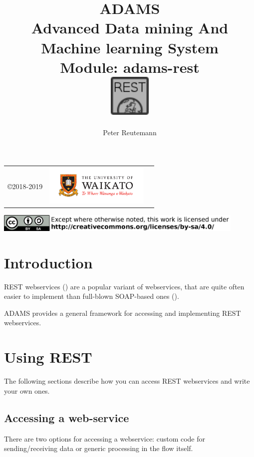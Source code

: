 \documentclass[a4paper]{book}
\title{
  \textbf{ADAMS} \\
  {\Large \textbf{A}dvanced \textbf{D}ata mining \textbf{A}nd \textbf{M}achine
  learning \textbf{S}ystem} \\
  {\Large Module: adams-rest} \\
  \vspace{1cm}
  \includegraphics[width=2cm]{images/rest-module.png} \\
}
\author{
  Peter Reutemann
}
\begin{document}
\begin{titlepage}
\maketitle

\thispagestyle{empty}
\center
\begin{table}[b]
	\begin{tabular}{c l l}
		\parbox[c][2cm]{2cm}{\copyright 2018-2019} &
		\parbox[c][2cm]{5cm}{\includegraphics[width=5cm]{images/coat_of_arms.pdf}} \\
	\end{tabular}
	\includegraphics[width=12cm]{images/cc.png} \\
\end{table}

\end{titlepage}

\tableofcontents

\chapter{Introduction}
REST webservices (\cite{rest}) are a popular variant of webservices, that
are quite often easier to implement than full-blown SOAP-based ones (\cite{soap}).

ADAMS provides a general framework for accessing and implementing REST webservices.

\chapter{Using REST}
The following sections describe how you can access REST webservices and write
your own ones.

\section{Accessing a web-service}
There are two options for accessing a webservice: custom code for sending/receiving
data or generic processing in the flow itself.
\end{document}
